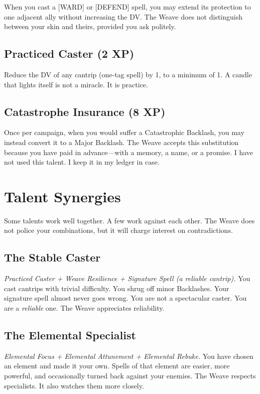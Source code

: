 When you cast a [WARD] or [DEFEND] spell, you may extend its protection to one adjacent ally without increasing the DV. The Weave does not distinguish between your skin and theirs, provided you ask politely.

\subsection{Practiced Caster (2 XP)}

Reduce the DV of any cantrip (one-tag spell) by 1, to a minimum of 1. A candle that lights itself is not a miracle. It is practice.

\subsection{Catastrophe Insurance (8 XP)}

Once per campaign, when you would suffer a Catastrophic Backlash, you may instead convert it to a Major Backlash. The Weave accepts this substitution because you have paid in advance---with a memory, a name, or a promise. I have not used this talent. I keep it in my ledger in case.

\section{Talent Synergies}

Some talents work well together. A few work against each other. The Weave does not police your combinations, but it will charge interest on contradictions.

\subsection{The Stable Caster}

\emph{Practiced Caster + Weave Resilience + Signature Spell (a reliable cantrip).} You cast cantrips with trivial difficulty. You shrug off minor Backlashes. Your signature spell almost never goes wrong. You are not a spectacular caster. You are a \emph{reliable} one. The Weave appreciates reliability.

\subsection{The Elemental Specialist}

\emph{Elemental Focus + Elemental Attunement + Elemental Rebuke.} You have chosen an element and made it your own. Spells of that element are easier, more powerful, and occasionally turned back against your enemies. The Weave respects specialists. It also watches them more closely.

